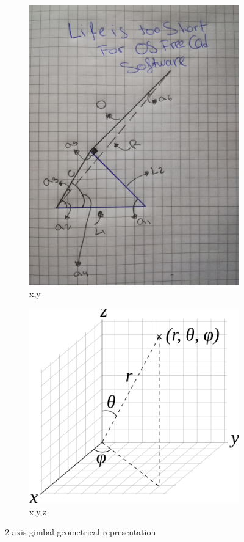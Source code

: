 \documentclass[12pt,twoside,a4paper]{article}
\begin{document}
\begin{figure}[h!]
  \centering
  \begin{subfigure}[b]{0.4\linewidth}
    \includegraphics[width=\linewidth]{equation}
    \caption{x,y}
  \end{subfigure}
  \begin{subfigure}[b]{0.4\linewidth}
    \includegraphics[width=\linewidth]{spherical}
    \caption{x,y,z}
  \end{subfigure}
  \caption{2 axis gimbal geometrical representation}
  \label{fig:coffee}
\end{figure}
\end{document}
